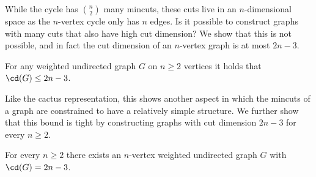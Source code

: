 While the cycle has $\binom{n}{2}$ many mincuts, these cuts live in an $n$-dimensional space as the $n$-vertex cycle only has $n$ edges.  Is it possible to construct graphs
with many cuts that also have high cut dimension?  We show that this is not possible, and in fact the cut dimension of an $n$-vertex graph is at most $2n-3$.
\begin{theorem}
\label{thm:cd_upper}
For any weighted undirected graph $G$ on $n\ge 2$ vertices it holds that $\cd(G) \le 2n-3$.
\end{theorem}
Like the cactus representation, this shows another aspect in which the mincuts of a graph are constrained to have a relatively simple structure.  We further show that this bound is
tight by constructing graphs with cut dimension $2n-3$ for every $n \ge 2$.
\begin{theorem}
\label{thm:cd_lower}
For every $n \ge 2$ there exists an $n$-vertex weighted undirected graph $G$ with $\cd(G) = 2n-3$.
\end{theorem}



